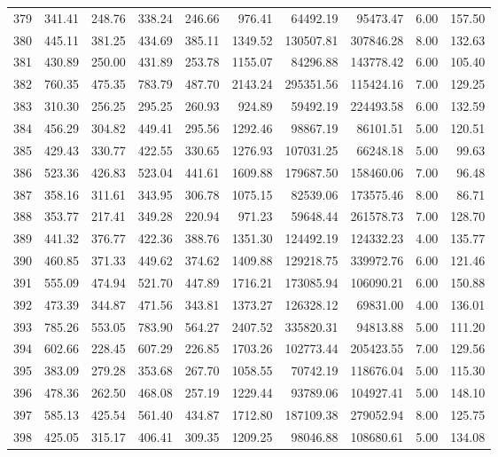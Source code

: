 \begin{tabular}{lrrrrrrrrr}
379 & 341.41 & 248.76 & 338.24 & 246.66 & 976.41 & 64492.19 & 95473.47 & 6.00 & 157.50 \\
380 & 445.11 & 381.25 & 434.69 & 385.11 & 1349.52 & 130507.81 & 307846.28 & 8.00 & 132.63 \\
381 & 430.89 & 250.00 & 431.89 & 253.78 & 1155.07 & 84296.88 & 143778.42 & 6.00 & 105.40 \\
382 & 760.35 & 475.35 & 783.79 & 487.70 & 2143.24 & 295351.56 & 115424.16 & 7.00 & 129.25 \\
383 & 310.30 & 256.25 & 295.25 & 260.93 & 924.89 & 59492.19 & 224493.58 & 6.00 & 132.59 \\
384 & 456.29 & 304.82 & 449.41 & 295.56 & 1292.46 & 98867.19 & 86101.51 & 5.00 & 120.51 \\
385 & 429.43 & 330.77 & 422.55 & 330.65 & 1276.93 & 107031.25 & 66248.18 & 5.00 & 99.63 \\
386 & 523.36 & 426.83 & 523.04 & 441.61 & 1609.88 & 179687.50 & 158460.06 & 7.00 & 96.48 \\
387 & 358.16 & 311.61 & 343.95 & 306.78 & 1075.15 & 82539.06 & 173575.46 & 8.00 & 86.71 \\
388 & 353.77 & 217.41 & 349.28 & 220.94 & 971.23 & 59648.44 & 261578.73 & 7.00 & 128.70 \\
389 & 441.32 & 376.77 & 422.36 & 388.76 & 1351.30 & 124492.19 & 124332.23 & 4.00 & 135.77 \\
390 & 460.85 & 371.33 & 449.62 & 374.62 & 1409.88 & 129218.75 & 339972.76 & 6.00 & 121.46 \\
391 & 555.09 & 474.94 & 521.70 & 447.89 & 1716.21 & 173085.94 & 106090.21 & 6.00 & 150.88 \\
392 & 473.39 & 344.87 & 471.56 & 343.81 & 1373.27 & 126328.12 & 69831.00 & 4.00 & 136.01 \\
393 & 785.26 & 553.05 & 783.90 & 564.27 & 2407.52 & 335820.31 & 94813.88 & 5.00 & 111.20 \\
394 & 602.66 & 228.45 & 607.29 & 226.85 & 1703.26 & 102773.44 & 205423.55 & 7.00 & 129.56 \\
395 & 383.09 & 279.28 & 353.68 & 267.70 & 1058.55 & 70742.19 & 118676.04 & 5.00 & 115.30 \\
396 & 478.36 & 262.50 & 468.08 & 257.19 & 1229.44 & 93789.06 & 104927.41 & 5.00 & 148.10 \\
397 & 585.13 & 425.54 & 561.40 & 434.87 & 1712.80 & 187109.38 & 279052.94 & 8.00 & 125.75 \\
398 & 425.05 & 315.17 & 406.41 & 309.35 & 1209.25 & 98046.88 & 108680.61 & 5.00 & 134.08 \\

\end{tabular}
